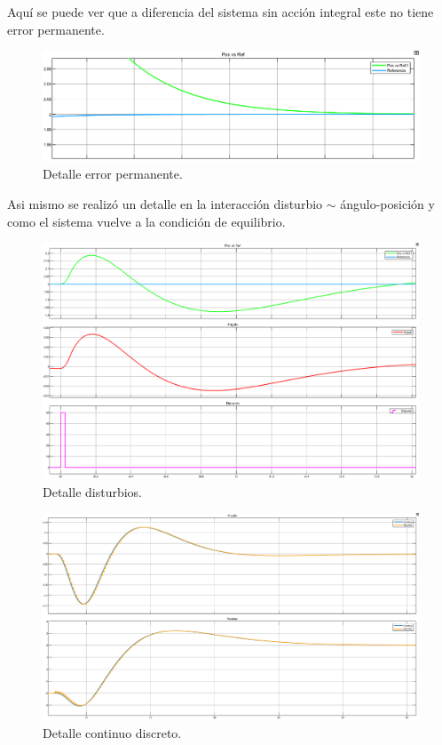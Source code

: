 Aquí se puede ver que a diferencia del sistema sin acci\'on integral este no tiene error permanente.
\begin{figure}[H]
	\centering
	\includegraphics[width=1\linewidth]{Imagenes/Control_integral_disc/detalle_error_permanente.png}
	\caption{Detalle error permanente.}
	\label{realmentacion_error}
\end{figure}

Asi mismo se realizó un detalle en la interacción disturbio $\sim$ ángulo-posici\'on y como el sistema vuelve a la condici\'on de equilibrio.
\begin{figure}[H]
	\centering
	\includegraphics[width=1\linewidth]{Imagenes/Control_integral_disc/detalle_disturbio.png}
	\caption{Detalle disturbios.}
	\label{realmentacion_disturbio}
\end{figure}

\begin{figure}[H]
	\centering
	\includegraphics[width=1\linewidth]{Imagenes/Control_integral_disc/detalle_real_medido.png}
	\caption{Detalle continuo discreto.}
	\label{realmentacion_disturbio}
\end{figure}
